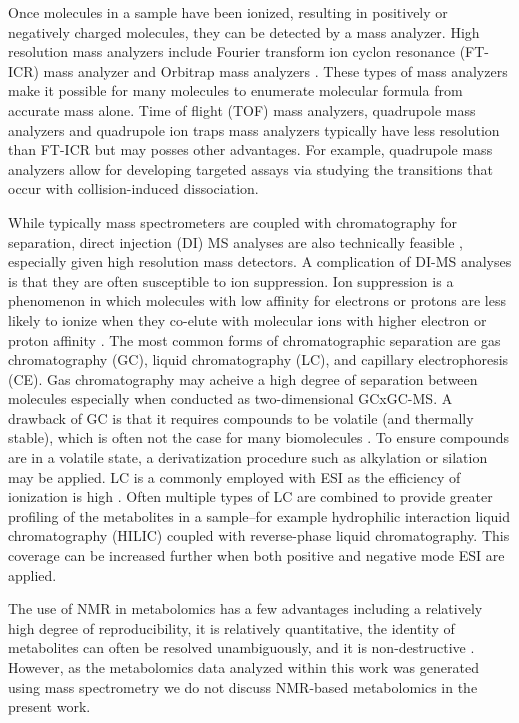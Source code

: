 \begin{DoubleSpace*}
Once molecules in a sample have been ionized, resulting in positively or negatively charged molecules, they can be detected by a mass analyzer. High resolution mass analyzers include Fourier transform ion cyclon resonance (FT-ICR) mass analyzer and Orbitrap mass analyzers \cite{sumner2011,gowda2014}. These types of mass analyzers make it possible for many molecules to enumerate molecular formula from accurate mass alone. Time of flight (TOF) mass analyzers, quadrupole mass analyzers and quadrupole ion traps mass analyzers typically have less resolution than FT-ICR but may posses other advantages. For example, quadrupole mass analyzers allow for developing targeted assays via studying the transitions that occur with collision-induced dissociation. 

While typically mass spectrometers are coupled with chromatography for separation, direct injection (DI) MS analyses are also technically feasible \cite{sumner2011}, especially given high resolution mass detectors. A complication of DI-MS analyses is that they are often susceptible to ion suppression. Ion suppression is a phenomenon in which molecules with low affinity for electrons or protons are less likely to ionize when they co-elute with molecular ions with higher electron or proton affinity \cite{gowda2014}. The most common forms of chromatographic separation are gas chromatography (GC), liquid chromatography (LC), and capillary electrophoresis (CE). Gas chromatography may acheive a high degree of separation between molecules especially when conducted as two-dimensional GCxGC-MS. A drawback of GC is that it requires compounds to be volatile (and thermally stable), which is often not the case for many biomolecules \cite{sumner2011}. To ensure compounds are in a volatile state, a derivatization procedure such as alkylation or silation may be applied. LC is a commonly employed with ESI as the efficiency of ionization is high \cite{sumner2011}. Often multiple types of LC are combined to provide greater profiling of the metabolites in a sample--for example hydrophilic interaction liquid chromatography (HILIC)  coupled with reverse-phase liquid chromatography. This coverage can be increased further when both positive and negative mode ESI are applied. 

The use of NMR in metabolomics has a few advantages including a relatively high degree of reproducibility, it is relatively quantitative, the identity of metabolites can often be resolved unambiguously, and it is non-destructive \cite{gowda2016}. However, as the metabolomics data analyzed within this work was generated using mass spectrometry we do not discuss NMR-based metabolomics in the present work.

\end{DoubleSpace*}
